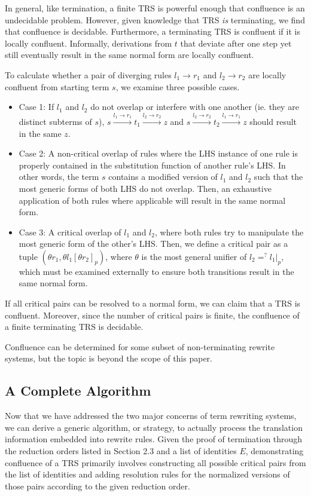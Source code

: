 \documentclass{article}
\begin{document}
In general, like termination, a finite TRS is powerful enough that confluence is an undecidable problem.
However, given knowledge that TRS \textit{is} terminating, we find that confluence is decidable.
Furthermore, a terminating TRS is confluent if it is locally confluent. Informally, derivations from $t$
that deviate after one step yet still eventually result in the same normal form are locally confluent.

To calculate whether a pair of diverging rules $l_1 \rightarrow r_1$ and $l_2 \rightarrow r_2$ are locally confluent from starting term $s$, we examine three possible cases.
\begin{itemize}
    \item Case 1: If $l_1$ and $l_2$ do not overlap or interfere with one another (ie. they are distinct subterms of $s$),
    $s \xrightarrow{l_1 \rightarrow r_1} t_1 \xrightarrow{l_2 \rightarrow r_2} z$ and
    $s \xrightarrow{l_2 \rightarrow r_2} t_2 \xrightarrow{l_1 \rightarrow r_1} z$ should result in the same $z$.
    \item Case 2: A non-critical overlap of rules where the LHS instance of one rule is properly contained in the substitution function of another rule's LHS.
    In other words, the term $s$ contains a modified version of $l_1$ and $l_2$ such that the most generic forms of both LHS do not overlap.
    Then, an exhaustive application of both rules where applicable will result in the same normal form.
    \item Case 3: A critical overlap of $l_1$ and $l_2$, where both rules try to manipulate the most generic form of the other's LHS.
    Then, we define a critical pair as a tuple $(\theta r_1, \theta l_1[\theta r_2]_p)$, where $\theta$ is the most general unifier of $l_2 =^? l_1|_p$,
    which must be examined externally to ensure both transitions result in the same normal form.
\end{itemize}
If all critical pairs can be resolved to a normal form, we can claim that a TRS is confluent.
Moreover, since the number of critical pairs is finite, the confluence of a finite terminating TRS is decidable.

Confluence can be determined for some subset of non-terminating rewrite systems, but the topic is beyond the scope of this paper.

\subsection{A Complete Algorithm}
Now that we have addressed the two major concerns of term rewriting systems, we can derive a generic algorithm, or strategy,
to actually process the translation information embedded into rewrite rules. Given the proof of termination
through the reduction orders listed in Section 2.3 and a list of identities $E$, demonstrating confluence of a TRS primarily
involves constructing all possible critical pairs from the list of identities
and adding resolution rules for the normalized versions of those pairs according to the given reduction order.
\end{document}
